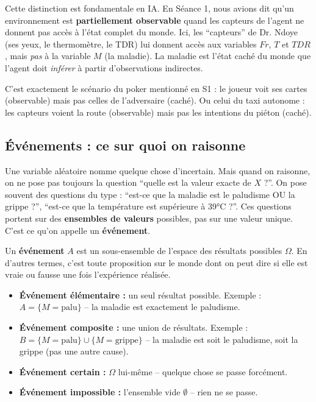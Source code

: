 \documentclass[11pt,a4paper]{article}
\begin{document}
\begin{attentionbox}
Cette distinction est fondamentale en IA. En Séance 1, nous avions dit qu'un environnement est \textbf{partiellement observable} quand les capteurs de l'agent ne donnent pas accès à l'état complet du monde. Ici, les ``capteurs'' de Dr. Ndoye (ses yeux, le thermomètre, le TDR) lui donnent accès aux variables $Fr$, $T$ et $TDR$, mais \textit{pas} à la variable $M$ (la maladie). La maladie est l'état caché du monde que l'agent doit \textit{inférer} à partir d'observations indirectes.

C'est exactement le scénario du poker mentionné en S1 : le joueur voit ses cartes (observable) mais pas celles de l'adversaire (caché). Ou celui du taxi autonome : les capteurs voient la route (observable) mais pas les intentions du piéton (caché).
\end{attentionbox}

\subsection{Événements : ce sur quoi on raisonne}

Une variable aléatoire nomme quelque chose d'incertain. Mais quand on raisonne, on ne pose pas toujours la question ``quelle est la valeur exacte de $X$ ?''. On pose souvent des questions du type : ``est-ce que la maladie est le paludisme OU la grippe ?'', ``est-ce que la température est supérieure à 39°C ?''. Ces questions portent sur des \textbf{ensembles de valeurs} possibles, pas sur une valeur unique. C'est ce qu'on appelle un \textbf{événement}.

\begin{definitionbox}
Un \textbf{événement} $A$ est un sous-ensemble de l'espace des résultats possibles $\Omega$. En d'autres termes, c'est toute proposition sur le monde dont on peut dire si elle est vraie ou fausse une fois l'expérience réalisée.

\begin{itemize}
    \item \textbf{Événement élémentaire :} un seul résultat possible. Exemple : $A = \{M = \text{palu}\}$ -- la maladie est exactement le paludisme.
    \item \textbf{Événement composite :} une union de résultats. Exemple : $B = \{M = \text{palu}\} \cup \{M = \text{grippe}\}$ -- la maladie est soit le paludisme, soit la grippe (pas une autre cause).
    \item \textbf{Événement certain :} $\Omega$ lui-même -- quelque chose se passe forcément.
    \item \textbf{Événement impossible :} l'ensemble vide $\emptyset$ -- rien ne se passe.
\end{itemize}
\end{definitionbox}
\end{document}
